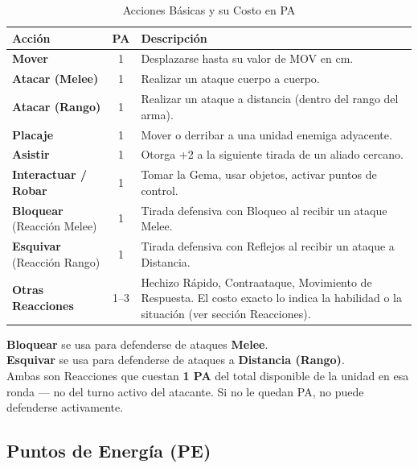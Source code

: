 \begin{table}[h]
\centering
\begin{tabularx}{\linewidth}{|l|c|X|}
\hline
\rowcolor{GoldRule!25} \textbf{Acción} & \textbf{PA} & \textbf{Descripción} \\ \hline
\textbf{Mover} & 1 & Desplazarse hasta su valor de MOV en cm. \\ \hline
\textbf{Atacar (Melee)} & 1 & Realizar un ataque cuerpo a cuerpo. \\ \hline
\textbf{Atacar (Rango)} & 1 & Realizar un ataque a distancia (dentro del rango del arma). \\ \hline
\textbf{Placaje} & 1 & Mover o derribar a una unidad enemiga adyacente. \\ \hline
\textbf{Asistir} & 1 & Otorga +2 a la siguiente tirada de un aliado cercano. \\ \hline
\textbf{Interactuar / Robar} & 1 & Tomar la Gema, usar objetos, activar puntos de control. \\ \hline
\textbf{Bloquear} (Reacción Melee) & 1 & Tirada defensiva con Bloqueo al recibir un ataque Melee. \\ \hline
\textbf{Esquivar} (Reacción Rango) & 1 & Tirada defensiva con Reflejos al recibir un ataque a Distancia. \\ \hline
\textbf{Otras Reacciones} & 1--3 & Hechizo Rápido, Contraataque, Movimiento de Respuesta. El costo exacto lo indica la habilidad o la situación (ver sección Reacciones). \\ \hline
\end{tabularx}
\caption{Acciones Básicas y su Costo en PA}
\end{table}

\begin{tcolorbox}[colback=GoldRule!10, colframe=GoldRule, title=\textbf{IMPORTANTE: Bloquear y Esquivar}]
\small
\textbf{Bloquear} se usa para defenderse de ataques \textbf{Melee}. \\
\textbf{Esquivar} se usa para defenderse de ataques a \textbf{Distancia (Rango)}. \\
Ambas son Reacciones que cuestan \textbf{1 PA} del total disponible de la unidad en esa ronda — no del turno activo del atacante. Si no le quedan PA, no puede defenderse activamente.
\end{tcolorbox}

\subsection{Puntos de Energía (PE)}

